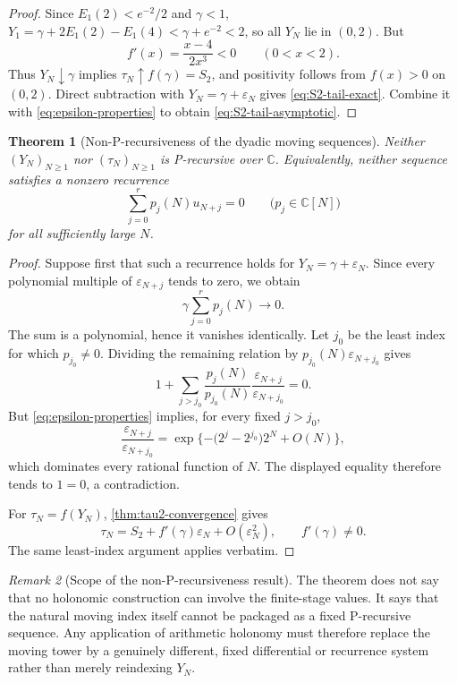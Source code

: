 \documentclass[11pt]{article}
\theoremstyle{keio}
\newtheorem{theorem}{Theorem}[section]
\theoremstyle{definition}
\theoremstyle{remark}
\newtheorem{remark}[theorem]{Remark}
\newcommand{\C}{\mathbb C}
\begin{document}
\begin{proof}
Since \(E_1(2)<e^{-2}/2\) and \(\gamma<1\),
\(Y_1=\gamma+2E_1(2)-E_1(4)<\gamma+e^{-2}<2\), so all \(Y_N\) lie in
\((0,2)\).  But
\[
 f'(x)=\frac{x-4}{2x^3}<0\qquad(0<x<2).
\]
Thus \(Y_N\downarrow\gamma\) implies \(\tau_N\uparrow f(\gamma)=S_2\), and
positivity follows from \(f(x)>0\) on \((0,2)\).  Direct subtraction with
\(Y_N=\gamma+\varepsilon_N\) gives \eqref{eq:S2-tail-exact}.  Combine it
with \eqref{eq:epsilon-properties} to obtain
\eqref{eq:S2-tail-asymptotic}.
\end{proof}

\begin{theorem}[Non-P-recursiveness of the dyadic moving sequences]
\label{thm:non-p-recursive}
Neither \((Y_N)_{N\ge1}\) nor \((\tau_N)_{N\ge1}\) is P-recursive over
\(\C\).  Equivalently, neither sequence satisfies a nonzero recurrence
\[
 \sum_{j=0}^r p_j(N)u_{N+j}=0
 \qquad\bigl(p_j\in\C[N]\bigr)
\]
for all sufficiently large \(N\).
\end{theorem}

\begin{proof}
Suppose first that such a recurrence holds for \(Y_N=\gamma+\varepsilon_N\).
Since every polynomial multiple of \(\varepsilon_{N+j}\) tends to zero, we
obtain
\[
 \gamma\sum_{j=0}^rp_j(N)\longrightarrow0.
\]
The sum is a polynomial, hence it vanishes identically.  Let \(j_0\) be the
least index for which \(p_{j_0}\ne0\).  Dividing the remaining relation by
\(p_{j_0}(N)\varepsilon_{N+j_0}\) gives
\[
 1+\sum_{j>j_0}
 \frac{p_j(N)}{p_{j_0}(N)}
 \frac{\varepsilon_{N+j}}{\varepsilon_{N+j_0}}=0.
\]
But \eqref{eq:epsilon-properties} implies, for every fixed \(j>j_0\),
\[
 \frac{\varepsilon_{N+j}}{\varepsilon_{N+j_0}}
 =\exp\{-\bigl(2^j-2^{j_0}\bigr)2^N+O(N)\},
\]
which dominates every rational function of \(N\).  The displayed equality
therefore tends to \(1=0\), a contradiction.

For \(\tau_N=f(Y_N)\), \cref{thm:tau2-convergence} gives
\[
 \tau_N=S_2+f'(\gamma)\varepsilon_N+O(\varepsilon_N^2),
 \qquad f'(\gamma)\ne0.
\]
The same least-index argument applies verbatim.
\end{proof}

\begin{remark}[Scope of the non-P-recursiveness result]
The theorem does not say that no holonomic construction can involve the
finite-stage values.  It says that the natural moving index itself cannot be
packaged as a fixed P-recursive sequence.  Any application of arithmetic
holonomy must therefore replace the moving tower by a genuinely different,
fixed differential or recurrence system rather than merely reindexing
\(Y_N\).
\end{remark}
\end{document}
